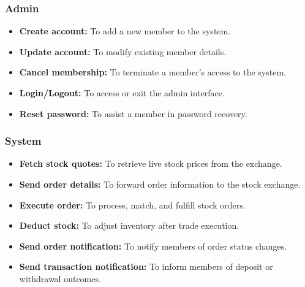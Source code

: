 \subsubsection{Admin}\label{JaAClp_6q0QlfmBtxSjWv}

\begin{itemize}
\item
\protect{}\label{ztnZWfP-t578etBH33qwL}
\textbf{Create account:} To add a new member to the system.
\item
\protect{}\label{lKvyWTYZvLcpsURwzXsIX}
\textbf{Update account:} To modify existing member details.
\item
\protect{}\label{zX4UaonkaDCZAAJlMYwUd}
\textbf{Cancel membership:} To terminate a member's access to the system.
\item
\protect{}\label{tMhRXA4lSywC7AE_7vE_z}
\textbf{Login/Logout:} To access or exit the admin interface.
\item
\protect{}\label{SBgnJcC8JAlqN3u5Mpo29}
\textbf{Reset password:} To assist a member in password recovery.
\end{itemize}

\subsubsection{System}\label{_yGT54A16HNvcSIKKfb-A}

\begin{itemize}
\item
\protect{}\label{oFv0Hb6k04ftr3-AE_66t}
\textbf{Fetch stock quotes:} To retrieve live stock prices from the exchange.
\item
\protect{}\label{REmpppfocKdp0fFwY_EtW}
\textbf{Send order details:} To forward order information to the stock exchange.
\item
\protect{}\label{FqIOVvur33GQ1hbUQRHj0}
\textbf{Execute order:} To process, match, and fulfill stock orders.
\item
\protect{}\label{uRG86pFkMhMmxBoSAbcAB}
\textbf{Deduct stock:} To adjust inventory after trade execution.
\item
\protect{}\label{iakEEmNA-vi7UFB67EGb_}
\textbf{Send order notification:} To notify members of order status changes.
\item
\protect{}\label{3VDfEUoVm45pHfuTAePB_}
\textbf{Send transaction notification:} To inform members of deposit or withdrawal outcomes.
\end{itemize}

